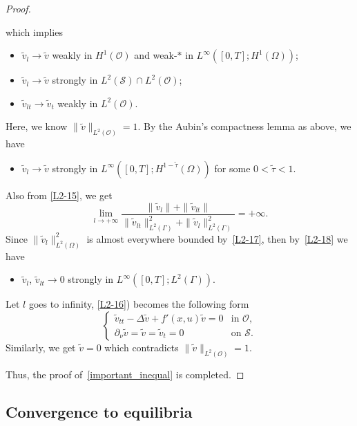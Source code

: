 \documentclass{elsarticle}
\begin{document}
\begin{proof}
\begin{itemize}
which implies
	\begin{itemize}
		\item $\tilde{v}_l \rightarrow \tilde{v}$ weakly in $H^{1}(\mathcal{O})$ and weak-$\ast$ in $L^{\infty}([0, T]; H^{1}(\Omega))$;
		\item $\tilde{v}_l \rightarrow \tilde{v}$ strongly in $L^{2}(\mathcal{S})\cap L^{2}(\mathcal{O})$;
		\item $\tilde{v}_{lt} \rightarrow \tilde{v}_t$ weakly in $L^{2}(\mathcal{O})$.
	\end{itemize}
Here, we know $\| \tilde{v} \|_{L^{2}(\mathcal{O})}=1$. By the Aubin's compactness lemma as above, we have
\begin{itemize}
	\item $\tilde{v}_l \rightarrow \tilde{v}$ strongly in $L^{\infty}([0, T]; H^{1-\tilde{\tau}}(\Omega))$ for some $0 < \tilde{\tau} <1 $.
\end{itemize}
Also from \eqref{L2-15}, we get
	\begin{equation}
		\lim_{l\rightarrow +\infty}\frac{\| \tilde{v}_l\|+\| \tilde{v}_{lt}\|}{\|\tilde{v}_{lt}\|^{2}_{L^2(\Gamma)}+\|\tilde{v}_{l}\|^{2}_{L^2(\Gamma)}}=+\infty.  \label{L2-18}
	\end{equation}
	Since $\| \tilde{v}_l\|_{L^2(\Omega)}^{2}$ is almost everywhere bounded by~\eqref{L2-17}, then by~\eqref{L2-18} we have
	\begin{itemize}
		\item $\tilde{v}_l$, $\tilde{v}_{lt} \rightarrow 0$ strongly in $L^{\infty}([0, T]; L^{2}(\Gamma))$.
	\end{itemize}
Let $l $ goes to infinity, \eqref{L2-16}) becomes the following form
\begin{equation*}
\left
    \{
        \begin{array}{ll}
            \tilde{v}_{tt} - \Delta \tilde{v} +f'(x, u)\tilde{v}= 0 &\textrm{in $\mathcal{O}$,}  \\
                 \partial_{\nu}\tilde{v} =\tilde{v} =\tilde{v}_t= 0 &\textrm{on $\mathcal{S}$.}
        \end{array}
\right.
\end{equation*}
Similarly, we get $\tilde{v}=0$ which contradicts $\| \tilde{v} \|_{L^{2}(\mathcal{O})} =1$. 
\end{itemize}
Thus, the proof of~\eqref{important_inequal} is completed. 
\end{proof}

\subsection{Convergence to equilibria}
\end{document}
